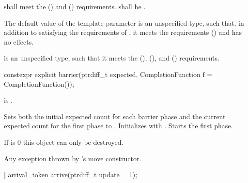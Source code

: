 \pnum
{} shall meet the
 () and
 () requirements.
 shall be .

\pnum
The default value of the  template parameter is
an unspecified type, such that,
in addition to satisfying the requirements of ,
it meets the 
requirements () and
 has no effects.

\pnum
{} is an unspecified type,
such that it meets the
 (),
 (), and
 () requirements.

\begin{itemdecl}
constexpr explicit barrier(ptrdiff_t expected,
                           CompletionFunction f = CompletionFunction());
\end{itemdecl}

\begin{itemdescr}
\pnum
\expects
{} is .

\pnum
\effects
Sets both the initial expected count for each barrier phase and
the current expected count for the first phase to .
Initializes  with .
Starts the first phase.
\begin{note}
If  is 0 this object can only be destroyed.
\end{note}

\pnum
\throws
Any exception thrown by 's move constructor.
\end{itemdescr}

%
\begin{itemdecl}
[[nodiscard]] arrival_token arrive(ptrdiff_t update = 1);
\end{itemdecl}

